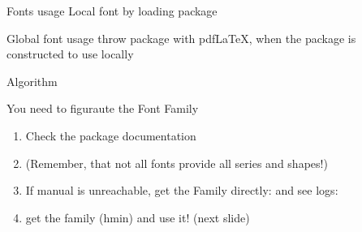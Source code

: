 



     

\begin{frame}[t, fragile]{Fonts usage \magicPage}{Local font by loading package}\relax

\relax

\end{frame}


\begin{frame}
\magicPage
     \centering\huge Global font usage throw package with pdf\LaTeX, when the package is constructed to use locally
     
\end{frame}

\begin{frame}[fragile]{Algorithm\magicPage}\relax

    You need to figuraute the {\csk Font Family}
    \begin{enumerate}
         \item Check the package documentation
         \item (Remember, that not all fonts provide all series and shapes!)
         \item If manual is unreachable, get the Family directly: \ccol{\showthe}\ccol{\font} and see {\csk logs}:
    \end{enumerate}
    
    
    \begin{enumerate}
        \setcounter{enumi}{3}
        \item get the family ({\csk hmin}) and use it! (next slide)
         
    \end{enumerate}
\end{frame}

